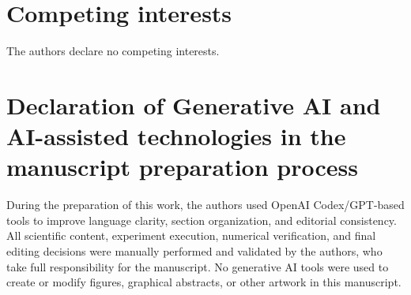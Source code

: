 \documentclass[5p,twocolumn,a4paper]{elsarticle}
\begin{document}
\section*{Competing interests}
The authors declare no competing interests.

\section*{Declaration of Generative AI and AI-assisted technologies in the manuscript preparation process}
During the preparation of this work, the authors used OpenAI Codex/GPT-based tools to improve language clarity, section organization, and editorial consistency. All scientific content, experiment execution, numerical verification, and final editing decisions were manually performed and validated by the authors, who take full responsibility for the manuscript. No generative AI tools were used to create or modify figures, graphical abstracts, or other artwork in this manuscript.



\end{document}

